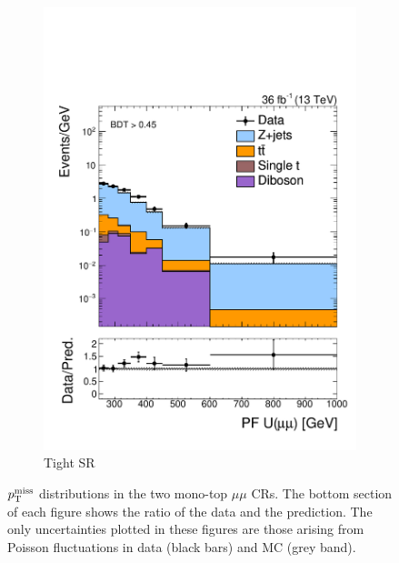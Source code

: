 \begin{figure}[!ht]
\begin{center}
\begin{subfigure}[t]{0.49\textwidth}
            \includegraphics[width=\textwidth]{figures/monotop/prefit/dimuon_tight_pfUZmag_logy.pdf}
            \caption{Tight SR}
        \end{subfigure}
        \caption{$p_\mathrm{T}^\mathrm{miss}$ distributions in the two mono-top $\mu\mu$ CRs.
                 The bottom section of each figure shows the ratio of the data and the prediction.
                 The only uncertainties plotted in these figures are those arising from Poisson fluctuations in data (black bars) and MC (grey band).}
        \label{fig:mt:prefit_dimuons}
    \end{center}
\end{figure}

